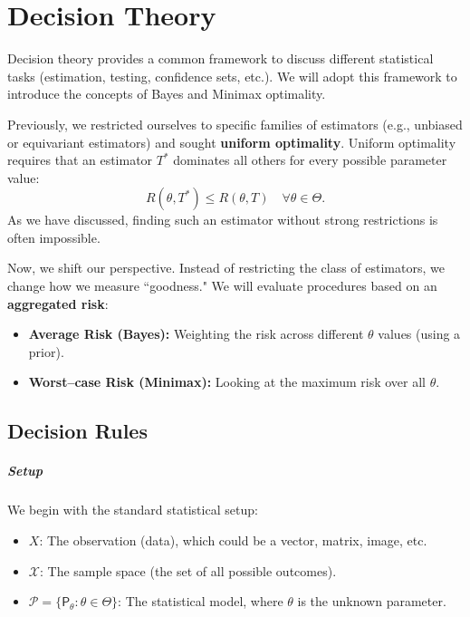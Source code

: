 \chapter{Decision Theory}
\label{cha:decision_theory}

Decision theory provides a common framework to discuss different statistical tasks (estimation, testing, confidence sets, etc.). We will adopt this framework to introduce the concepts of Bayes and Minimax optimality.

\medskip

Previously, we restricted ourselves to specific families of estimators (e.g., unbiased or equivariant estimators) and sought \textbf{uniform optimality}. Uniform optimality requires that an estimator \(T^*\) dominates all others for every possible parameter value:
\[
R(\theta, T^*) \leq R(\theta, T) \quad \forall \theta \in \Theta.
\]
As we have discussed, finding such an estimator without strong restrictions is often impossible.

Now, we shift our perspective. Instead of restricting the class of estimators, we change how we measure ``goodness." We will evaluate procedures based on an \textbf{aggregated risk}:
\begin{itemize}
    \item \textbf{Average Risk (Bayes):} Weighting the risk across different \(\theta\) values (using a prior).
    \item \textbf{Worst--case Risk (Minimax):} Looking at the maximum risk over all \(\theta\).
\end{itemize}

\section{Decision Rules}
\label{sec:decision_rules}

\paragraph{Setup}
\label{subsec:setup_decision}

We begin with the standard statistical setup:
\begin{itemize}
    \item \(X\): The observation (data), which could be a vector, matrix, image, etc.
    \item \(\mathcal{X}\): The sample space (the set of all possible outcomes).
    \item \(\mathcal{P} = \{ \mathsf{P}_{\theta} : \theta \in \Theta \}\): The statistical model, where \(\theta\) is the unknown parameter.
\end{itemize}


